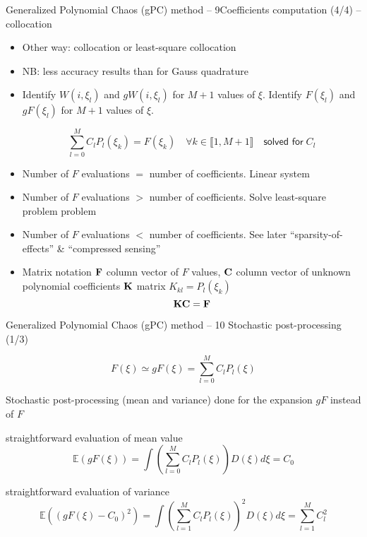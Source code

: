 \documentclass[10pt]{beamer}
\def\vt{\vspace{2mm}}
\def\vf{\vspace{4mm}}
\def\vv{\vspace{5mm}}
\def\begit{\begin{itemize}}
\def\endit{\end{itemize}}
\newcommand{\esp}{{\mathbb E}}
\begin{document}
\begin{frame}{Generalized Polynomial Chaos (gPC) method -- 9}{Coefficients computation (4/4) -- collocation}
%
\footnotesize{
%
\begit

\item Other way: collocation or least-square collocation 
\item NB: less accuracy results than for Gauss quadrature
 \vf
\item Identify $W(i,\xi_l)$ and  $gW(i,\xi_l)$ for $M+1$ values of $\xi$.  Identify $F(\xi_l)$ and  $gF(\xi_l)$ for $M+1$ values of $\xi$. 

  $$  \sum_{l=0}^{M} C_l P_l(\xi_k) = F(\xi_k)\quad\forall k\in \llbracket 1,M+1\rrbracket \quad\textsf{solved for}\;C_l$$

\vt
\item[1] Number of $F$ evaluations $=$ number of coefficients. Linear system 
\item[2] Number of $F$ evaluations $>$ number of coefficients. Solve least-square problem problem
\item[3] Number of $F$ evaluations $<$ number of coefficients. See later ``sparsity-of-effects'' \& ``compressed sensing''
\vv
\item Matrix notation $ {\bf F}  $ column vector of $F$ values, ${\bf C}$ column vector of unknown polynomial coefficients 
 ${\bf K}$ matrix $K_{kl}=  P_l(\xi_k) $
%
    $$   {\bf K}{\bf C} = {\bf F}  $$
%
\endit
%
}
%
\end{frame} 
%
%
\begin{frame}{Generalized Polynomial Chaos (gPC) method -- 10}{ Stochastic post-processing (1/3) }
%
\footnotesize
{
 $$ F(\xi) \simeq gF(\xi) = \sum_{l=0}^{M} C_l P_l(\xi)$$
%
\begit
\item Stochastic post-processing (mean and variance) done for the expansion $gF$ instead of $F$
   \begit 
\footnotesize{
   \item straightforward evaluation of mean value
      $$ \esp(gF(\xi)) = \int \left( \sum_{l=0}^{M} C_l P_l(\xi) \right)  D(\xi) d\xi = C_0 $$
  \item straightforward evaluation of variance
      $$ \esp((gF(\xi)-C_0)^2)=\int \left( \sum_{l=1}^{M}  C_l P_l(\xi) \right) ^2 D(\xi)d\xi = \sum_{l=1}^{M}  C_l^2 $$ 
 }
   \endit
\endit
%
}
\end{frame} 
\end{document}
